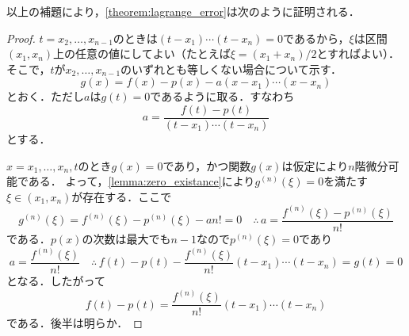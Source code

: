 \documentclass[a4paper]{ltjsarticle}
\theoremstyle{definition}
\begin{document}
以上の補題により，\cref{theorem:lagrange_error}は次のように証明される．

\begin{proof}
  $t=x_2,\dots,x_{n-1}$のときは$(t-x_1)\dotsm (t-x_n)=0$であるから，$\xi$は区間$(x_1,x_n)$上の任意の値にしてよい（たとえば$\xi=(x_1+x_n)/2$とすればよい）．
  そこで，$t$が$x_2,\dots,x_{n-1}$のいずれとも等しくない場合について示す．
  \[
    g(x) = f(x)-p(x)-a(x-x_1)\dotsm (x-x_n)
  \]
  とおく．ただし$a$は$g(t)=0$であるように取る．すなわち
  \[
    a = \frac{f(t)-p(t)}{(t-x_1)\dotsm (t-x_n)}
  \]
  とする．

  $x=x_1,\dots,x_n,t$のとき$g(x)=0$であり，かつ関数$g(x)$は仮定により$n$階微分可能である．
  よって，\cref{lemma:zero_existance}により$g^{(n)}(\xi)=0$を満たす$\xi\in (x_1,x_n)$が存在する．ここで
  \[
    g^{(n)}(\xi) = f^{(n)}(\xi)-p^{(n)}(\xi)-an! = 0\quad\therefore\, a = \frac{f^{(n)}(\xi)-p^{(n)}(\xi)}{n!}
  \]
  である．$p(x)$の次数は最大でも$n-1$なので$p^{(n)}(\xi)=0$であり
  \[
    a = \frac{f^{(n)}(\xi)}{n!}
    \quad\therefore\, f(t)-p(t)-\frac{f^{(n)}(\xi)}{n!}(t-x_1)\dotsm (t-x_n) = g(t) = 0
  \]
  となる．したがって
  \[
    f(t)-p(t) = \frac{f^{(n)}(\xi)}{n!}(t-x_1)\dotsm (t-x_n)
  \]
  である．後半は明らか．
\end{proof}
\end{document}
